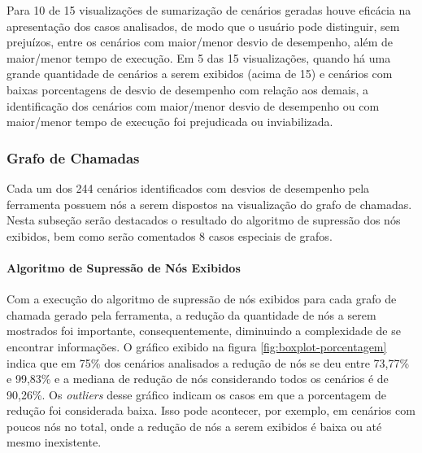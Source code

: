 \begin{framed}
  \noindent Para 10 de 15 visualizações de sumarização de cenários geradas houve eficácia na apresentação dos casos analisados, de modo que o usuário pode distinguir, sem prejuízos, entre os cenários com maior/menor desvio de desempenho, além de maior/menor tempo de execução. Em 5 das 15 visualizações, quando há uma grande quantidade de cenários a serem exibidos (acima de 15) e cenários com baixas porcentagens de desvio de desempenho com relação aos demais, a identificação dos cenários com maior/menor desvio de desempenho ou com maior/menor tempo de execução foi prejudicada ou inviabilizada.
\end{framed}

\subsubsection{Grafo de Chamadas} \label{subsec:avaliacao-comportamento-grafo-chamadas}

Cada um dos 244 cenários identificados com desvios de desempenho pela ferramenta possuem nós a serem dispostos na visualização do grafo de chamadas. Nesta subseção serão destacados o resultado do algoritmo de supressão dos nós exibidos, bem como serão comentados 8 casos especiais de grafos.

\paragraph{Algoritmo de Supressão de Nós Exibidos}

Com a execução do algoritmo de supressão de nós exibidos para cada grafo de chamada gerado pela ferramenta, a redução da quantidade de nós a serem mostrados foi importante, consequentemente, diminuindo a complexidade de se encontrar informações. O gráfico exibido na figura \ref{fig:boxplot-porcentagem} indica que em 75\% dos cenários analisados a redução de nós se deu entre 73,77\% e 99,83\% e a mediana de redução de nós considerando todos os cenários é de 90,26\%. Os \textit{outliers} desse gráfico indicam os casos em que a porcentagem de redução foi considerada baixa. Isso pode acontecer, por exemplo, em cenários com poucos nós no total, onde a redução de nós a serem exibidos é baixa ou até mesmo inexistente.


